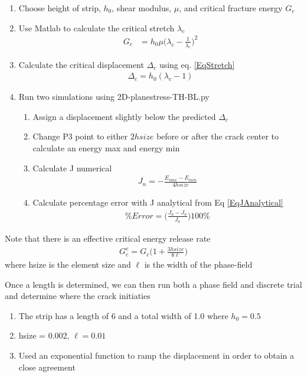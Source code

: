 \documentclass[12pt,3p]{article}
\numberwithin{equation}{section}
\begin{document}
\begin{enumerate}
\item Choose height of strip, $h_0$, shear modulus, $\mu$, and critical fracture energy $G_c$
\item Use Matlab to calculate the critical stretch $\lambda_c$
\begin{align*}
G_c &= h_0 \mu \bigg( \lambda_c - \frac{1}{\lambda_c} \bigg)^2
\end{align*}
\item Calculate the critical displacement $\Delta_c$ using eq. \ref{EqStretch}
\begin{align*}
\Delta_c = h_0 (\lambda_c - 1)
\end{align*}
\item Run two simulations using 2D-planestress-TH-BL.py

	\begin{enumerate}
	\item Assign a displacement slightly below the predicted $\Delta_c$
	\item Change P3 point to either $2hsize$ before or after the crack center to calculate an energy max and energy min
	\item Calculate J numerical 
	\begin{align*}
	J_n = - \frac{E_{max} - E_{min}}{4 hsize}
	\end{align*}
	\item Calculate percentage error with J analytical from Eq \eqref{EqJAnalytical}
	\begin{align*}
	\% Error = \bigg( \frac{J_a - J_n}{J_a} \bigg) 100 \%
	\end{align*}
	\end{enumerate}
\end{enumerate}
Note that there is an effective critical energy release rate
\begin{align}
G_c^e = G_c \bigg( 1 + \frac{3 hsize}{8 \ell}  \bigg)
\end{align}
where hsize is the element size and $\ell$ is the width of the phase-field 

Once a length is determined, we can then run both a phase field and discrete trial and determine where the crack initiaties
\begin{enumerate}
\item The strip has a length of 6 and a total width of 1.0 where $h_0 = 0.5$
\item hsize = 0.002, $\ell = 0.01$
\item Used an exponential function to ramp the displacement in order to obtain a close agreement
\end{enumerate}
\end{document}
